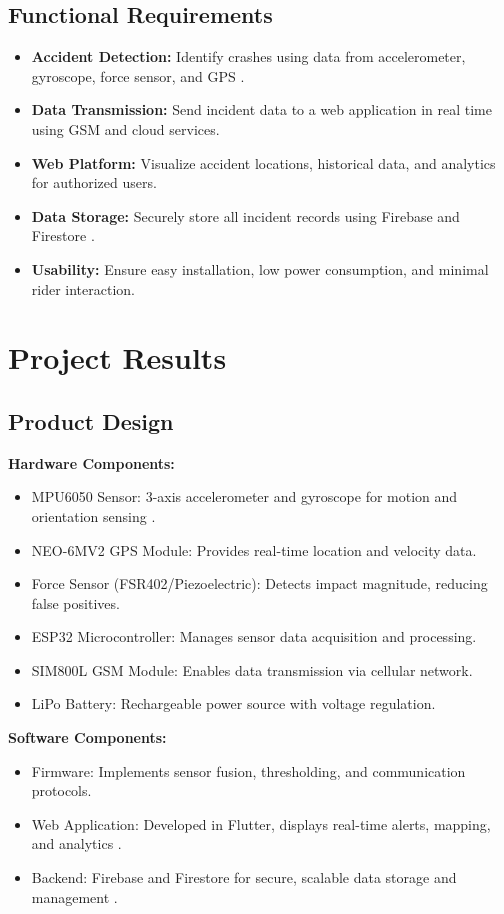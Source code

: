 \documentclass[12pt]{article}
\begin{document}
\subsection{Functional Requirements}
\begin{itemize}
  \item \textbf{Accident Detection:} Identify crashes using data from accelerometer, gyroscope, force sensor, and GPS \cite{mpu6050}.
  \item \textbf{Data Transmission:} Send incident data to a web application in real time using GSM and cloud services.
  \item \textbf{Web Platform:} Visualize accident locations, historical data, and analytics for authorized users.
  \item \textbf{Data Storage:} Securely store all incident records using Firebase and Firestore \cite{firebase}.
  \item \textbf{Usability:} Ensure easy installation, low power consumption, and minimal rider interaction.
\end{itemize}

\section{Project Results}

\subsection{Product Design}

\textbf{Hardware Components:}
\begin{itemize}
  \item MPU6050 Sensor: 3-axis accelerometer and gyroscope for motion and orientation sensing \cite{mpu6050}.
  \item NEO-6MV2 GPS Module: Provides real-time location and velocity data.
  \item Force Sensor (FSR402/Piezoelectric): Detects impact magnitude, reducing false positives.
  \item ESP32 Microcontroller: Manages sensor data acquisition and processing.
  \item SIM800L GSM Module: Enables data transmission via cellular network.
  \item LiPo Battery: Rechargeable power source with voltage regulation.
\end{itemize}

\textbf{Software Components:}
\begin{itemize}
  \item Firmware: Implements sensor fusion, thresholding, and communication protocols.
  \item Web Application: Developed in Flutter, displays real-time alerts, mapping, and analytics \cite{flutter}.
  \item Backend: Firebase and Firestore for secure, scalable data storage and management \cite{firebase}.
\end{itemize}
\end{document}
